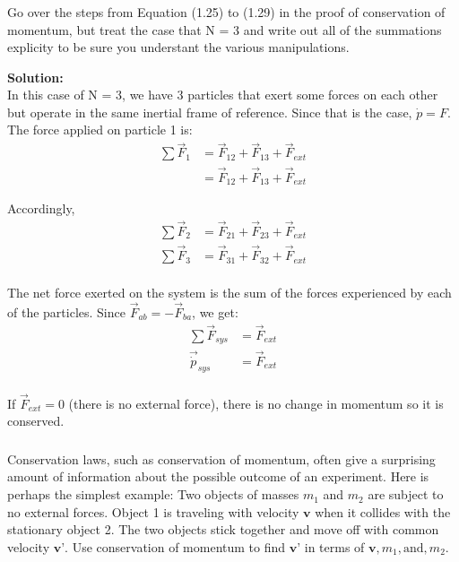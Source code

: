 \documentclass{article}
\newcommand\Problem{%
    \subsubsection{}%
}
\newcommand\TheSolution{%
  \textbf{Solution:}\\%
}
\begin{document}
\Problem Go over the steps from Equation (1.25) to (1.29) in the proof of conservation of momentum, but treat the case that N = 3 and write out all of the summations explicity to be sure you understant the various manipulations.

\TheSolution In this case of N = 3, we have 3 particles that exert some forces on each other but operate in the same inertial frame of reference. Since that is the case, $\dot{p} = F$. The force applied on particle 1 is:
\begin{equation}
    \begin{aligned}
        \sum \vec{F}_1 & = \vec{F}_12 + \vec{F}_13 + \vec{F}_{ext} \\
                       & = \vec{F}_12 + \vec{F}_13 + \vec{F}_{ext}
    \end{aligned}
\end{equation}

Accordingly,
\begin{equation}
    \begin{aligned}
        \sum \vec{F}_2 & = \vec{F}_21 + \vec{F}_23 + \vec{F}_{ext} \\
        \sum \vec{F}_3 & = \vec{F}_31 + \vec{F}_32 + \vec{F}_{ext} \\
    \end{aligned}
\end{equation}

The net force exerted on the system is the sum of the forces experienced by each of the particles. Since $\vec{F}_{ab} = -\vec{F}_{ba}$, we get:
\begin{equation}
    \begin{aligned}
        \sum \vec{F}_{sys}  & = \vec{F}_{ext} \\
        \vec{\dot{p}}_{sys} & = \vec{F}_{ext} \\
    \end{aligned}
\end{equation}

If $\vec{F}_{ext} = 0$ (there is no external force), there is no change in momentum so it is conserved.

\Problem
Conservation laws, such as conservation of momentum, often give a surprising amount of information about the possible outcome of an experiment. Here is perhaps the simplest example: Two objects of masses $m_1$ and $m_2$ are subject to no external forces. Object 1 is traveling with velocity $\textbf{v}$ when it collides with the stationary object 2. The two objects stick together and move off with common velocity $\textbf{v'}$. Use conservation of momentum to find $\textbf{v'}$ in terms of $\textbf{v}, \textit{m}_1, \text{and}, \textit{m}_2$.
\end{document}
